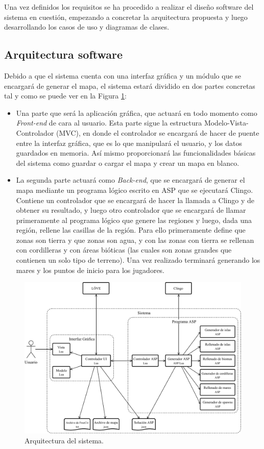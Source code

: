 Una vez definidos los requisitos se ha procedido a realizar el diseño software del sistema en cuestión, empezando a concretar la arquitectura propuesta y luego desarrollando los casos de uso y diagramas de clases.

\subsection{Arquitectura software}
\label{subsec:arquitectura}

Debido a que el sistema cuenta con una interfaz gráfica y un módulo que se encargará de generar el mapa, el sistema estará dividido en dos partes concretas tal y como se puede ver en la Figura \ref{fig:arquitectura}:

\begin{itemize}
	\item Una parte que será la aplicación gráfica, que actuará en todo momento como \textit{Front-end} de cara al usuario. Esta parte sigue la estructura Modelo-Vista-Controlador (MVC), en donde el controlador se encargará de hacer de puente entre la interfaz gráfica, que es lo que manipulará el usuario, y los datos guardados en memoria. Así mismo proporcionará las funcionalidades básicas del sistema como guardar o cargar el mapa y crear un mapa en blanco.
	\item La segunda parte actuará como \textit{Back-end}, que se encargará de generar el mapa mediante un programa lógico escrito en ASP que se ejecutará Clingo. Contiene un controlador que se encargará de hacer la llamada a Clingo y de obtener su resultado, y luego otro controlador que se encargará de llamar primeramente al programa lógico que genere las regiones y luego, dada una región, rellene las casillas de la región. Para ello primeramente define que zonas son tierra y que zonas son agua, y con las zonas con tierra se rellenan con cordilleras y con áreas bióticas (las cuales son zonas grandes que contienen un solo tipo de terreno). Una vez realizado terminará generando los mares y los puntos de inicio para los jugadores.
\end{itemize}

\begin{figure}[!h]
	\centering
	\includegraphics[width=\textwidth]{images/arquitectura.pdf}
	\caption{Arquitectura del sistema.}
	\label{fig:arquitectura}
\end{figure}

